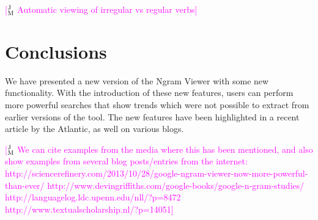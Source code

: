 \documentclass[11pt]{article}
\newcommand{\heb}[1]{%
  \foreignlanguage{hebrew}{#1} }
\newcommand{\jmcomment}[1]{\textcolor{magenta}{[$^{\textsc{J}}_{\textsc{M}}$ #1]}}
\newcommand{\eat}[1]{\ignorespaces}
\begin{document}

\jmcomment{Automatic viewing of irregular vs regular verbs}




\section{Conclusions}
We have presented a new version of the Ngram Viewer with some new functionality. With the introduction of these new features, users can perform more powerful searches that show trends which were not possible to extract from earlier versions of the tool. The new features have been highlighted in a recent article by the Atlantic, as well on various blogs.

\jmcomment{We can cite examples from the media where this has been mentioned, and also show examples from several blog posts/entries from the internet:
http://sciencerefinery.com/2013/10/28/google-ngram-viewer-now-more-powerful-than-ever/
http://www.devingriffiths.com/google-books/google-n-gram-studies/
http://languagelog.ldc.upenn.edu/nll/?p=8472
http://www.textualscholarship.nl/?p=14051}



\end{document}
